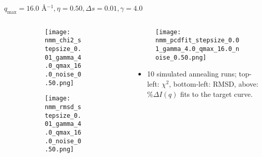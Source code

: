 \documentclass{beamer}
\begin{document}
\begin{frame}{$ q_{\textrm{max}}=16.0 $ \AA $^{-1}, \eta=0.50, \Delta s=0.01, \gamma=4.0$}
	\begin{columns}
		\begin{column}{.5\textwidth}
			\begin{figure}[H]
			\centering
			\begin{subfigure}[b]{\textwidth}
				\centering
				\texttt{[image: nmm\_chi2\_stepsize\_0.01\_gamma\_4.0\_qmax\_16.0\_noise\_0.50.png]}
				\label{fig:}
			\end{subfigure}
			\begin{subfigure}[b]{\textwidth}
				\centering
				\texttt{[image: nmm\_rmsd\_stepsize\_0.01\_gamma\_4.0\_qmax\_16.0\_noise\_0.50.png]}
				\label{fig:}
			\end{subfigure}
			\end{figure}
		\end{column}
		\begin{column}{.5\textwidth}
			\begin{figure}[H]
				\centering
				\texttt{[image: nmm\_pcdfit\_stepsize\_0.01\_gamma\_4.0\_qmax\_16.0\_noise\_0.50.png]}
				\label{fig:}
			\end{figure}
			\begin{itemize}
				\item 10 simulated annealing runs; top-left: $\chi^2$, bottom-left: RMSD, above: $\%\Delta I(q)$ fits to the target curve.
			\end{itemize}
		\end{column}
	\end{columns}
\end{frame}
 
\end{document}
